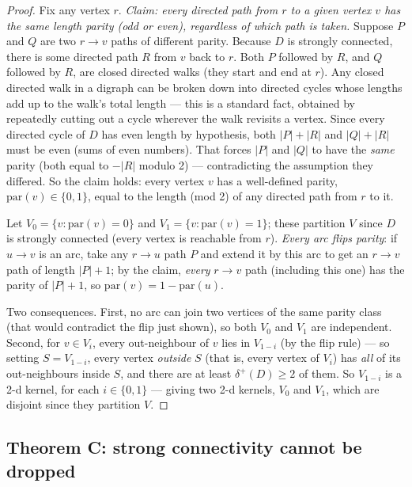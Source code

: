 \documentclass[11pt]{article}
\theoremstyle{plain}
\theoremstyle{definition}
\theoremstyle{remark}
\begin{document}
\begin{proof}
Fix any vertex $r$. \emph{Claim: every directed path from $r$ to a given vertex $v$
has the same length parity (odd or even), regardless of which path is taken.} Suppose
$P$ and $Q$ are two $r \to v$ paths of different parity. Because $D$ is strongly
connected, there is some directed path $R$ from $v$ back to $r$. Both $P$ followed by
$R$, and $Q$ followed by $R$, are closed directed walks (they start and end at $r$).
Any closed directed walk in a digraph can be broken down into directed cycles whose
lengths add up to the walk's total length — this is a standard fact, obtained by
repeatedly cutting out a cycle wherever the walk revisits a vertex. Since every
directed cycle of $D$ has even length by hypothesis, both $|P| + |R|$ and $|Q| + |R|$
must be even (sums of even numbers). That forces $|P|$ and $|Q|$ to have the \emph{same}
parity (both equal to $-|R|$ modulo 2) — contradicting the assumption they differed.
So the claim holds: every vertex $v$ has a well-defined parity, $\mathrm{par}(v) \in
\{0,1\}$, equal to the length (mod 2) of any directed path from $r$ to it.

Let $V_0 = \{v : \mathrm{par}(v) = 0\}$ and $V_1 = \{v : \mathrm{par}(v) = 1\}$; these
partition $V$ since $D$ is strongly connected (every vertex is reachable from $r$).
\emph{Every arc flips parity}: if $u \to v$ is an arc, take any $r \to u$ path $P$ and
extend it by this arc to get an $r \to v$ path of length $|P| + 1$; by the claim,
\emph{every} $r \to v$ path (including this one) has the parity of $|P|+1$, so
$\mathrm{par}(v) = 1 - \mathrm{par}(u)$.

Two consequences. First, no arc can join two vertices of the same parity class (that
would contradict the flip just shown), so both $V_0$ and $V_1$ are independent.
Second, for $v \in V_i$, every out-neighbour of $v$ lies in $V_{1-i}$ (by the flip
rule) — so setting $S = V_{1-i}$, every vertex \emph{outside} $S$ (that is, every
vertex of $V_i$) has \emph{all} of its out-neighbours inside $S$, and there are at
least $\delta^+(D) \ge 2$ of them. So $V_{1-i}$ is a 2-d kernel, for each $i \in
\{0,1\}$ — giving two 2-d kernels, $V_0$ and $V_1$, which are disjoint since they
partition $V$.
\end{proof}

\subsection{Theorem C: strong connectivity cannot be dropped}
\label{sec:C}
\end{document}

